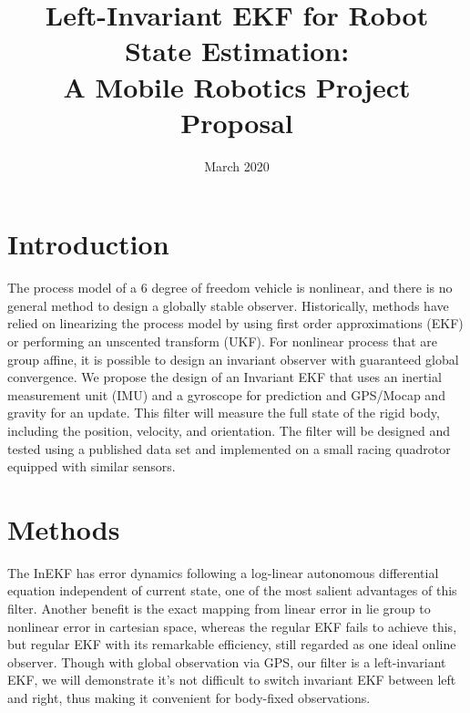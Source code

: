 \documentclass{IEEEtran}
\title{Left-Invariant EKF for Robot State Estimation:\\%
A Mobile Robotics Project Proposal}
\date{March 2020}
\begin{document}
\maketitle
\section{Introduction}
The process model of a 6 degree of freedom vehicle is nonlinear, and there is no general method to design a globally stable observer.  Historically, methods have relied on linearizing the process model by using first order approximations (EKF) or performing an unscented transform (UKF)\cite{thrun2005probabilistic}. %
For nonlinear process that are group affine, it is possible to design an invariant observer with guaranteed global convergence\cite{InEKF_Barrau}. We propose the design of an Invariant EKF that uses an inertial measurement unit (IMU) and a gyroscope for prediction and GPS/Mocap and gravity for an update. This filter will measure the full state of the rigid body, including the position, velocity, and orientation. The filter will be designed and tested using a published data set and implemented on a small racing quadrotor equipped with similar sensors.
%
\section{Methods}
The InEKF has error dynamics following a log-linear autonomous differential equation independent of current state, one of the most salient advantages of this filter. Another benefit is the exact mapping from linear error in lie group to nonlinear error in cartesian space, whereas the regular EKF fails to achieve this, but regular EKF with its remarkable efficiency, still regarded as one ideal online observer. Though with global observation via GPS, our filter is a left-invariant EKF, we will demonstrate it's not difficult to switch invariant EKF between left and right, thus making it convenient for body-fixed observations.
%
\end{document}

